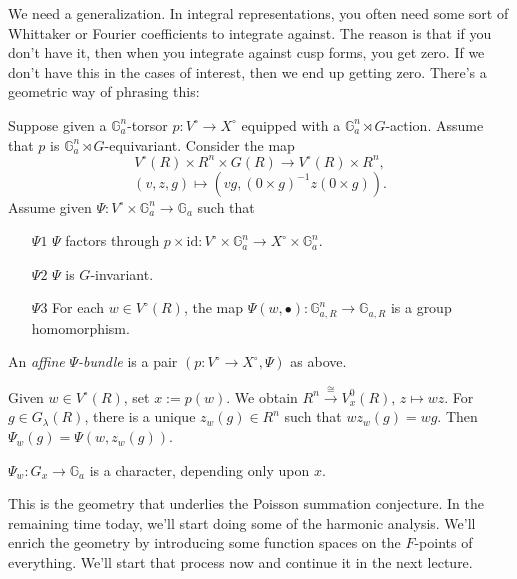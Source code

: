 \documentclass[reqno]{amsart} 
\begin{document}
We need a generalization.  In integral representations, you often need some sort of Whittaker or Fourier coefficients to integrate against.  The reason is that if you don't have it, then when you integrate against cusp forms, you get zero.  If we don't have this in the cases of interest, then we end up getting zero.  There's a geometric way of phrasing this:
\begin{definition}\label{definition:cq6tho7nvw}
  Suppose given a $\mathbb{G}_a^n$-torsor $p : V^{\circ} \rightarrow X^{\circ}$ equipped with a $\mathbb{G}_a^n \rtimes G$-action.  Assume that $p$ is $\mathbb{G}_a^n \rtimes G$-equivariant.  Consider the map
  \begin{equation*}
    V^{\circ}(R) \times R^n \times G(R) \rightarrow V^{\circ}(R) \times R^n,
  \end{equation*}
  \begin{equation*}
    (v, z, g) \mapsto(v g,(0 \times g)^{-1} z(0 \times g)).
  \end{equation*}
  Assume given $\Psi : V^{\circ} \times \mathbb{G}_a^n \rightarrow \mathbb{G}_a$ such that
  \begin{enumerate}
  \item [$\Psi 1$] $\Psi$ factors through $p \times \mathrm{id} : V^{\circ} \times \mathbb{G}_a^n \rightarrow X^{\circ} \times \mathbb{G}_a^n$.
  \item [$\Psi 2$] $\Psi$ is $G$-invariant.
  \item [$\Psi 3$] For each $w \in V^{\circ}(R)$, the map $\Psi(w, \bullet) : \mathbb{G}_{a, R}^n \rightarrow \mathbb{G}_{a, R}$ is a group homomorphism.
  \end{enumerate}
  An \emph{affine} $\Psi$\emph{-bundle} is a pair $(p : V^{\circ} \rightarrow X^{\circ}, \Psi)$ as above.
\end{definition}
Given $w \in V^{\circ}(R)$, set $x := p(w)$.  We obtain $R^n \xrightarrow{\cong} V_x^0(R)$, $z \mapsto w z$.  For $g \in G_\lambda(R)$, there is a unique $z_w(g) \in R^n$ such that $w z_w(g) = w g$.  Then $\Psi_w(g) = \Psi(w, z_w(g))$.
\begin{lemma}\label{lemma:cq6tho7lzu}
  $\Psi_w : G_x \rightarrow \mathbb{G}_a$ is a character, depending only upon $x$.
\end{lemma}

This is the geometry that underlies the Poisson summation conjecture.  In the remaining time today, we'll start doing some of the harmonic analysis.  We'll enrich the geometry by introducing some function spaces on the $F$-points of everything.  We'll start that process now and continue it in the next lecture.
\end{document}
